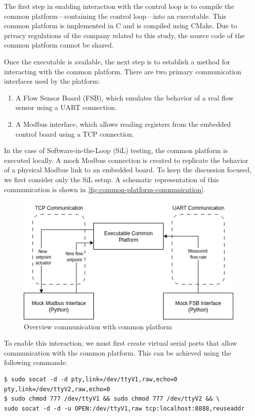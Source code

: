 \documentclass[we,final,11pt,oneside,openany]{uantwerpenbamathesis}
\begin{document}
The first step in enabling interaction with the control loop is to compile the common platform—containing the control loop—into an executable.
This common platform is implemented in C and is compiled using CMake.
Due to privacy regulations of the company related to this study, the source code of the common platform cannot be shared.

Once the executable is available, the next step is to establish a method for interacting with the common platform.
There are two primary communication interfaces used by the platform:

\begin{enumerate}
    \item A Flow Sensor Board (FSB), which emulates the behavior of a real flow sensor using a UART connection.
    \item A Modbus interface, which allows reading registers from the embedded control board using a TCP connection.
\end{enumerate}

In the case of Software-in-the-Loop (SiL) testing, the common platform is executed locally.
A mock Modbus connection is created to replicate the behavior of a physical Modbus link to an embedded board.
To keep the discussion focused, we first consider only the SiL setup.
A schematic representation of this communication is shown in \autoref{fig:common-platform-communication}.

\begin{figure}[h!]
    \centering
    \includegraphics[width=0.6\linewidth]{Images/generated/common-platform-communication}
    \caption{Overview communication with common platform}
    \label{fig:common-platform-communication}
\end{figure}

To enable this interaction, we must first create virtual serial ports that allow communication with the common platform.
This can be achieved using the following commands:

\begin{lstlisting}[style=bashstyle, caption={Creating virtual ports for communication}]
$ sudo socat -d -d pty,link=/dev/ttyV1,raw,echo=0 pty,link=/dev/ttyV2,raw,echo=0
$ sudo chmod 777 /dev/ttyV1 && sudo chmod 777 /dev/ttyV2 && \
sudo socat -d -d -u OPEN:/dev/ttyV1,raw tcp:localhost:8888,reuseaddr
\end{lstlisting}
\end{document}
